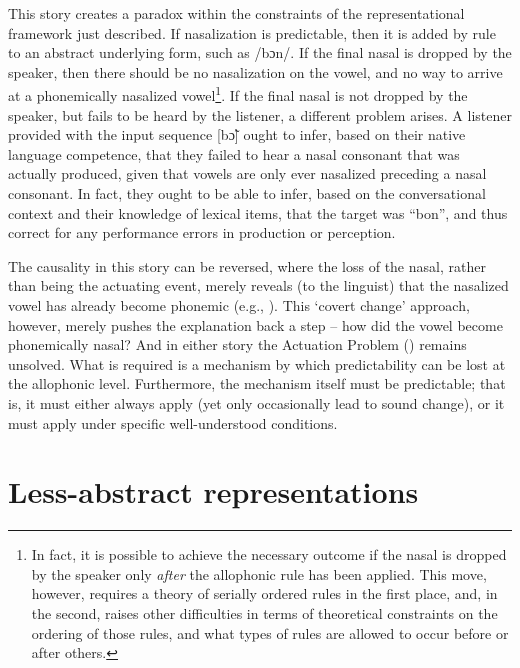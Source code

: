 This story creates a paradox within the constraints of the representational
framework just described. If nasalization is predictable, then it
is added by rule to an abstract underlying form, such as {/bɔn/}.
If the final nasal is dropped by the speaker, then there should be
no nasalization on the vowel, and no way to arrive at a phonemically
nasalized vowel\footnote{In fact, it is possible to achieve the necessary outcome if the nasal
is dropped by the speaker only \emph{after} the allophonic rule has
been applied. This move, however, requires a theory of serially ordered
rules in the first place, and, in the second, raises other difficulties
in terms of theoretical constraints on the ordering of those rules,
and what types of rules are allowed to occur before or after others.}. If the final nasal is not dropped by the speaker, but fails to be
heard by the listener, a different problem arises. A listener provided
with the input sequence {[bɔ̃]} ought to infer, based on
their native language competence, that they failed to hear a nasal
consonant that was actually produced, given that vowels are only ever
nasalized preceding a nasal consonant. In fact, they ought to be able
to infer, based on the conversational context and their knowledge
of lexical items, that the target was “bon”, and thus correct
for any performance errors in production or perception.

The causality in this story can be reversed, where the loss of the
nasal, rather than being the actuating event, merely reveals (to the
linguist) that the nasalized vowel has already become phonemic (e.g.,
\citealt{Janda2003}). This `covert change' approach, however, merely
pushes the explanation back a step – how did the vowel become phonemically
nasal? And in either story the Actuation Problem (\citealt{Labov1968})
remains unsolved. What is required is a mechanism by which predictability
can be lost at the allophonic level. Furthermore, the mechanism itself
must be predictable; that is, it must either always apply (yet only
occasionally lead to sound change), or it must apply under specific
well-understood conditions.

\section{\label{sec:Less-abstract-Representations}Less-abstract representations}


